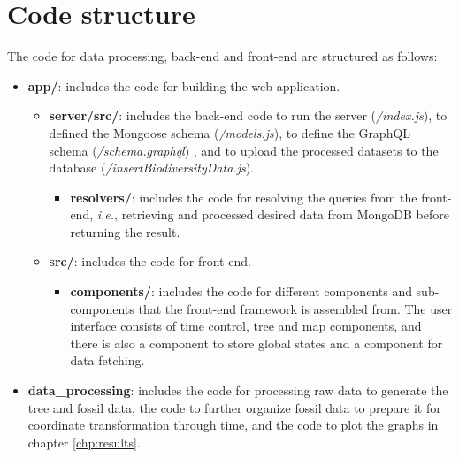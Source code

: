 \documentclass[11pt, a4paper,oneside,chapterprefix=false]{scrbook}
\begin{document}
\section{Code structure} \label{sec:implementation_code_structure}
The code for data processing, back-end and front-end are structured as follows: 
\begin{itemize}
	\item \textbf{app/}: includes the code for building the web application.
	\begin{itemize}	
		\item \textbf{server/src/}: includes the back-end code to run the server (\emph{/index.js}), to defined the Mongoose schema (\emph{/models.js}), to define the GraphQL schema (\emph{/schema.graphql}) , and to upload the processed datasets to the database (\emph{/insertBiodiversityData.js}).
		\begin{itemize}	
			\item \textbf{resolvers/}: includes the code for resolving the queries from the front-end, \textit{i.e.}, retrieving and processed desired data from MongoDB before returning the result.
		\end{itemize}
		\item \textbf{src/}: includes the code for front-end.
		\begin{itemize}	
			\item \textbf{components/}: includes the code for different components and sub-components that the front-end framework is assembled from. The user interface consists of time control, tree and map components, and there is also a component to store global states and a component for data fetching.
		\end{itemize}
	\end{itemize}
	
	\item \textbf{data\_processing}: includes the code for processing raw data to generate the tree and fossil data, the code to further organize fossil data to prepare it for coordinate transformation through time, and the code to plot the graphs in chapter \ref{chp:results}.
\end{itemize}
\newpage
\end{document}
